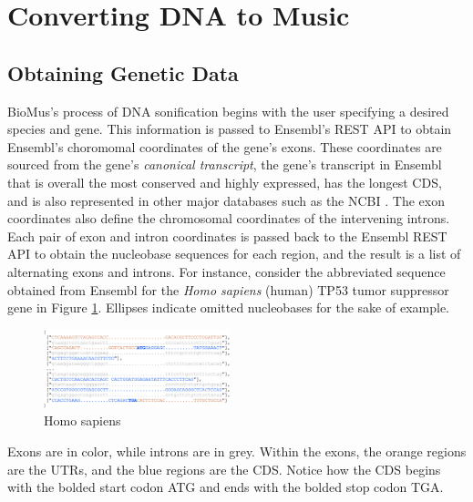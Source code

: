 \documentclass[letterpaper]{article}
\begin{document}
\section{Converting DNA to Music}
\subsection{Obtaining Genetic Data}
BioMus's process of DNA sonification begins with the user specifying a desired species and gene. This information is passed to Ensembl's REST API to obtain Ensembl's choromomal coordinates of the gene's exons. These coordinates are sourced from the gene's \textit{canonical transcript}, the gene's transcript in Ensembl that is overall the most conserved and highly expressed, has the longest CDS, and is also represented in other major databases such as the NCBI \cite{ensembl_transcript_flags}. The exon coordinates also define the chromosomal coordinates of the intervening introns. Each pair of exon and intron coordinates is passed back to the Ensembl REST API to obtain the nucleobase sequences for each region, and the result is a list of alternating exons and introns. For instance, consider the abbreviated sequence obtained from Ensembl for the \textit{Homo sapiens} (human) TP53 tumor suppressor gene in Figure \ref{fig:pre_processed_seq_homo_sapiens_tp53}. Ellipses indicate omitted nucleobases for the sake of example.

\begin{figure}[h!]
\centering
\includegraphics[width=0.48\textwidth]{images/pre_processed_seq_homo_sapiens_tp53_ABBREV}
  \caption{Homo sapiens}\label{fig:pre_processed_seq_homo_sapiens_tp53}
  \vspace{-3mm}
\end{figure}

Exons are in color, while introns are in grey. Within the exons, the orange regions are the UTRs, and the blue regions are the CDS. Notice how the CDS begins with the bolded start codon ATG and ends with the bolded stop codon TGA. 
\end{document}
